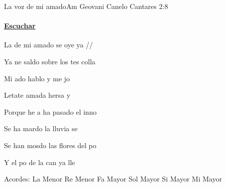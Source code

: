 \documentclass[12pt, spanish]{book}
\begin{document}
    \begin{song}{La voz de mi amado}{Am}
    {} %
    {Geovani Canelo}
    {Cantares 2:8} %
    {}
        \ifChordBk
        \paragraph{\mbox{}\hfill\protect\href{https://open.spotify.com/intl-es/track/6BNdGH1fVzktRXnZeCQdnU}{Escuchar}\mbox{}\hfill}
        \fi


        \begin{SBOpGroup}
            La  de mi amado se oye ya //

            Ya ne saldo sobre los tes  colla
        \end{SBOpGroup}

        \begin{SBChorus}
            Mi ado hablo y me jo

            Letate amada  hersa  y 

            Porque he a ha pasado el inno

            Se ha mardo la lluvia se 

            Se han mosdo las flores del po

            Y el po de la can ya lle
        \end{SBChorus}

        \ifChordBk
        \begin{SBOpGroup}
            Acordes:
            \upchord{\Am}\qquad La Menor \hfill
            \upchord{\Dm}\qquad Re Menor \hfill\null\break
            \upchord{\F}\qquad Fa Mayor \hfill
            \upchord{\G}\qquad Sol Mayor \hfill\null\break
            \upchord{\B}\qquad Si Mayor \hfill
            \upchord{\E}\qquad Mi Mayor \hfill\null\break
        \end{SBOpGroup}
        \fi
    \end{song}
\end{document}
